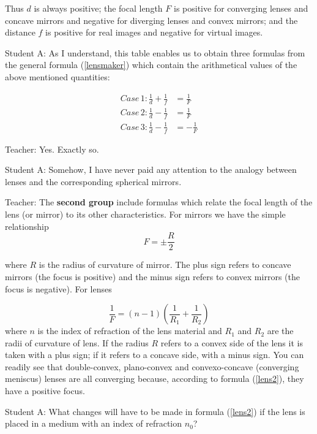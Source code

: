 \documentclass[a4paper,12pt]{book}
\begin{document}
{Thus $d$ is always positive; the focal length $F$ is positive for converging lenses and concave mirrors and negative for diverging lenses and convex mirrors; and the distance $f$ is positive for real images and negative for virtual images.

{\sc Student A:} As I understand, this table enables us to obtain three formulas from the general formula (\ref{lensmaker}) which contain the arithmetical values of the above mentioned quantities:

\begin{align}
Case \,1: \frac{1}{d}+\frac{1}{f} & = \frac{1}{F} \\
Case \,2: \frac{1}{d}-\frac{1}{f} & = \frac{1}{F} \\
Case \,3: \frac{1}{d}-\frac{1}{f} & = -\frac{1}{F}
\end{align}
 
 {\sc Teacher:} Yes. Exactly so.
 
 {\sc Student A:} Somehow, I have never paid any attention to the analogy between lenses and the corresponding spherical mirrors.
 
 {\sc Teacher:} The {\bf second group} include formulas which relate the focal length of the lens (or mirror) to its other characteristics. For mirrors we have the simple relationship
 \begin{equation}
F = \pm \frac{R}{2} \label{mirror2}
\end{equation}

where $R$ is the radius of curvature of mirror. The plus sign refers to concave mirrors (the focus is positive) and the minus sign refers to convex mirrors (the focus is negative). For lenses

\begin{equation}
\frac{1}{F} = (n-1) \left( \frac{1}{R_{1}} + \frac{1}{R_{2}} \right) \label{lens2}
\end{equation}
 where $n$ is the index of refraction of the lens material and $R_{1}$ and $R_{2}$ are the radii of curvature of lens. If the radius $R$ refers to a convex side of the lens it is taken with a plus sign; if it refers to a concave side, with a minus sign. You can readily see that double-convex, plano-convex and convexo-concave (converging meniscus) lenses are all converging because, according to formula (\ref{lens2}), they have a positive focus.
 
 {\sc Student A:} What changes will have to be made in formula (\ref{lens2}) if the lens is placed in a medium with an index of refraction $n_{0}$?
 
}
\end{document}
